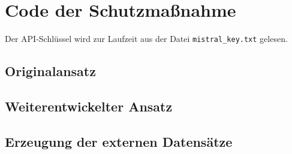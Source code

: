 \chapter{Code der Schutzmaßnahme}\label{ch:code}

Der API-Schlüssel wird zur Laufzeit aus der Datei \texttt{mistral\_key.txt} gelesen.

\section{Originalansatz}\label{sec:code_original}


\section{Weiterentwickelter Ansatz}\label{sec:code_new_approach}


\section{Erzeugung der externen Datensätze}\label{sec:code_bipia}


